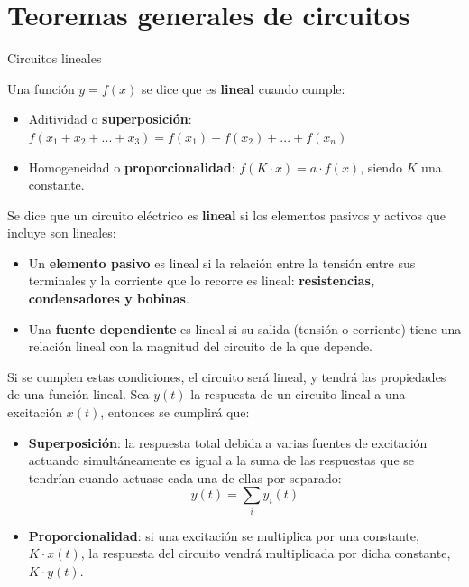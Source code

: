 \documentclass[11pt]{book} %
\makeatletter
\numberwithin{dummy}{section}
\theoremstyle{ocrenumbox}
\theoremstyle{blacknumex}
\theoremstyle{blacknumbox}
\theoremstyle{ocrenum}
\renewcommand{\section}{\@startsection{section}{1}{\z@}
{-4ex \@plus -1ex \@minus -.4ex}
{1ex \@plus.2ex }
{\normalfont\large\sffamily\bfseries}}
\newlength\esp
\newcommand{\thechapterimage}{}%
\newcommand{\chapterimage}[1]{\renewcommand{\thechapterimage}{#1}}%
\makeatother
\begin{document}
	
	\chapterimage{imagen_t4.jpg} %
	\chapter{Teoremas generales de circuitos}
	
	\section{Circuitos lineales}
	
	Una función $y=f(x)$ se dice que es \textbf{lineal} cuando cumple: 
	\begin{itemize}
	    \item Aditividad o \textbf{superposición}: $f(x_1+x_2+...+x_3)=f(x_1)+f(x_2)+...+f(x_n)$
	    \item Homogeneidad o \textbf{proporcionalidad}: $f(K\cdot x)=a\cdot f(x)$, siendo $K$ una constante.
	\end{itemize}
	Se dice que un circuito eléctrico es \textbf{lineal} si los elementos pasivos y activos que incluye son lineales:
	\begin{itemize}
	    \item Un \textbf{elemento pasivo} es lineal si la relación entre la tensión entre sus terminales y la corriente que lo recorre es lineal: \textbf{resistencias, condensadores y bobinas}.
        \item Una \textbf{fuente dependiente} es lineal si su salida (tensión o corriente) tiene una relación lineal con la magnitud del circuito de la que depende.
	\end{itemize}
    Si se cumplen estas condiciones, el circuito será lineal, y tendrá las propiedades de una función lineal. Sea $y(t)$ la respuesta de un circuito lineal a una excitación $x(t)$, entonces se cumplirá que:
    \begin{itemize}
    \item \textbf{Superposición}: la respuesta total debida a varias fuentes de excitación actuando simultáneamente es igual a la suma de las respuestas que se tendrían cuando actuase cada una de ellas por separado:
    \begin{equation*}
        y(t) = \sum_i y_i(t)
    \end{equation*}
    \item \textbf{Proporcionalidad}: si una excitación se multiplica por una constante, $K\cdot x(t)$, la respuesta del circuito vendrá multiplicada por dicha constante, $K\cdot y(t)$. 
    \end{itemize}
    
\end{document}
